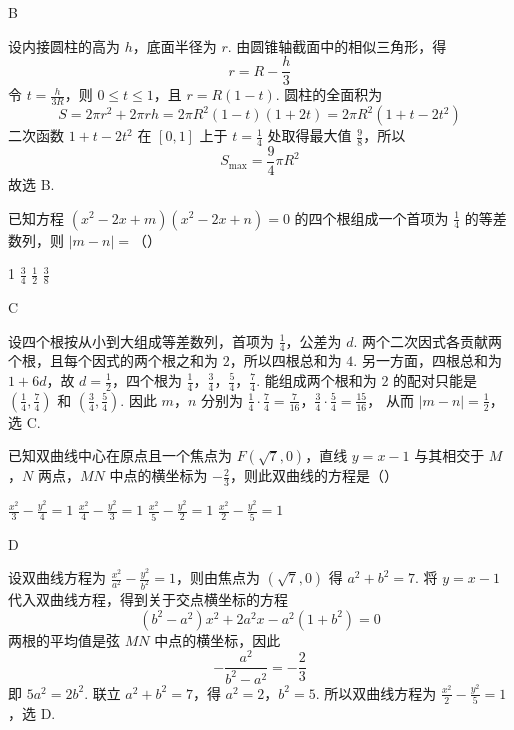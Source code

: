 \begin{answer}
B
\end{answer}

\begin{solution}
设内接圆柱的高为 \(h\)，底面半径为 \(r\). 由圆锥轴截面中的相似三角形，得
\[
r=R-\frac h3
\]
令 \(t=\frac{h}{3R}\)，则 \(0\leqslant t\leqslant1\)，且 \(r=R(1-t)\). 圆柱的全面积为
\[
S=2\pi r^2+2\pi rh=2\pi R^2(1-t)(1+2t)=2\pi R^2(1+t-2t^2)
\]
二次函数 \(1+t-2t^2\) 在 \([0,1]\) 上于 \(t=\frac14\) 处取得最大值 \(\frac98\)，所以
\[
S_{\max}=\frac94\pi R^2
\]
故选 B.
\end{solution}

\begin{problem}
已知方程 \((x^{2} - 2x + m)(x^{2} - 2x + n) = 0\) 的四个根组成一个首项为 \(\frac{1}{4}\) 的等差数列，则 \(|m - n| =\)（\quad）

\choices
    {1}
    {\(\frac{3}{4}\)}
    {\(\frac{1}{2}\)}
    {\(\frac{3}{8}\)}
\end{problem}

\begin{answer}
C
\end{answer}

\begin{solution}
设四个根按从小到大组成等差数列，首项为 \(\frac14\)，公差为 \(d\). 两个二次因式各贡献两个根，且每个因式的两个根之和为 \(2\)，所以四根总和为 \(4\). 另一方面，四根总和为 \(1+6d\)，故 \(d=\frac12\)，四个根为 \(\frac14\)，\(\frac34\)，\(\frac54\)，\(\frac74\). 能组成两个根和为 \(2\) 的配对只能是 \(\left(\frac14,\frac74\right)\) 和 \(\left(\frac34,\frac54\right)\). 因此 \(m\)，\(n\) 分别为
\(\frac14\cdot\frac74=\frac7{16}\)，\(\frac34\cdot\frac54=\frac{15}{16}\)，
从而 \(|m-n|=\frac12\)，选 C.
\end{solution}

\begin{problem}
已知双曲线中心在原点且一个焦点为 \(F(\sqrt{7}, 0)\)，直线 \(y = x - 1\) 与其相交于 \(M\)，\(N\) 两点，\(MN\) 中点的横坐标为 \(-\frac{2}{3}\)，则此双曲线的方程是（\quad）

\choices
    {\(\frac{x^2}{3} - \frac{y^2}{4} = 1\)}
    {\(\frac{x^2}{4} - \frac{y^2}{3} = 1\)}
    {\(\frac{x^2}{5} - \frac{y^2}{2} = 1\)}
    {\(\frac{x^2}{2} -\frac{y^2}{5} = 1\)}
\end{problem}

\begin{answer}
D
\end{answer}

\begin{solution}
设双曲线方程为 \(\frac{x^2}{a^2}-\frac{y^2}{b^2}=1\)，则由焦点为 \((\sqrt7,0)\) 得 \(a^2+b^2=7\). 将 \(y=x-1\) 代入双曲线方程，得到关于交点横坐标的方程
\[
(b^2-a^2)x^2+2a^2x-a^2(1+b^2)=0
\]
两根的平均值是弦 \(MN\) 中点的横坐标，因此
\[
-\frac{a^2}{b^2-a^2}=-\frac23
\]
即 \(5a^2=2b^2\). 联立 \(a^2+b^2=7\)，得 \(a^2=2\)，\(b^2=5\). 所以双曲线方程为 \(\frac{x^2}{2}-\frac{y^2}{5}=1\)，选 D.
\end{solution}

